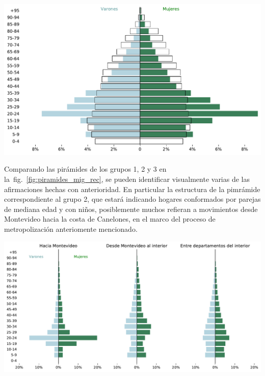 \documentclass[12pt,spanish,]{article}
\let\origfigure\figure
\let\endorigfigure\endfigure
\renewenvironment{figure}[1][2] {
    \expandafter\origfigure\expandafter[H]
} {
    \endorigfigure
}
\begin{document}
\begin{figure}
\centering
\includegraphics{./tex2pdf.-8c1f0593c1a83dbe/1d0238859672b630db570be11ac54a39ca2696a0.pdf}
\caption{Pirámides de población del total de población y de los
migrantes internos.}
\end{figure}

Comparando las pirámides de los grupos 1, 2 y 3 en
la~fig.~\ref{fig:piramides_mig_rec}, se pueden identificar visualmente
varias de las afirmaciones hechas con anterioridad. En particular la
estructura de la pimrámide correspondiente al grupo 2, que estará
indicando hogares conformados por parejas de mediana edad y con niños,
posiblemente muchos refieran a movimientos desde Montevideo hacia la
costa de Canelones, en el marco del proceso de metropolización
anteriomente mencionado.

\begin{figure}
\hypertarget{fig:piramides_mig_rec}{%
\centering
\includegraphics{./tex2pdf.-8c1f0593c1a83dbe/9df7a052b593b5eba7775a004f9848c10cc3b554.pdf}
\caption{Pirámides de población migrantes internos desde el Interior
hacia Montevideo, desde Montevideo al interior o entre departamentos del
interior.}\label{fig:piramides_mig_rec}
}
\end{figure}
\end{document}
